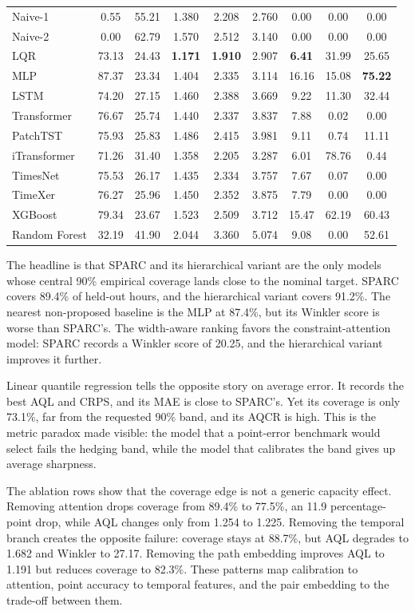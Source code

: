 \documentclass[twoside]{article}
\begin{document}
\begin{table}[t]
{\begin{tabular}{lcccccccc}
Naive-1 & 0.55 & 55.21 & 1.380 & 2.208 & 2.760 & 0.00 & 0.00 & 0.00 \\
Naive-2 & 0.00 & 62.79 & 1.570 & 2.512 & 3.140 & 0.00 & 0.00 & 0.00 \\
LQR & 73.13 & 24.43 & \textbf{1.171} & \textbf{1.910} & 2.907 & \textbf{6.41} & 31.99 & 25.65 \\
MLP & 87.37 & 23.34 & 1.404 & 2.335 & 3.114 & 16.16 & 15.08 & \textbf{75.22} \\
LSTM & 74.20 & 27.15 & 1.460 & 2.388 & 3.669 & 9.22 & 11.30 & 32.44 \\
Transformer & 76.67 & 25.74 & 1.440 & 2.337 & 3.837 & 7.88 & 0.02 & 0.00 \\
PatchTST & 75.93 & 25.83 & 1.486 & 2.415 & 3.981 & 9.11 & 0.74 & 11.11 \\
iTransformer & 71.26 & 31.40 & 1.358 & 2.205 & 3.287 & 6.01 & 78.76 & 0.44 \\
TimesNet & 75.53 & 26.17 & 1.435 & 2.334 & 3.757 & 7.67 & 0.07 & 0.00 \\
TimeXer & 76.27 & 25.96 & 1.450 & 2.352 & 3.875 & 7.79 & 0.00 & 0.00 \\
XGBoost & 79.34 & 23.67 & 1.523 & 2.509 & 3.712 & 15.47 & 62.19 & 60.43 \\
Random Forest & 32.19 & 41.90 & 2.044 & 3.360 & 5.074 & 9.08 & 0.00 & 52.61 \\
\bottomrule
\end{tabular}}
\end{table}

The headline is that SPARC and its hierarchical variant are the only models whose central 90\% empirical coverage lands close to the nominal target. SPARC covers 89.4\% of held-out hours, and the hierarchical variant covers 91.2\%. The nearest non-proposed baseline is the MLP at 87.4\%, but its Winkler score is worse than SPARC's. The width-aware ranking favors the constraint-attention model: SPARC records a Winkler score of 20.25, and the hierarchical variant improves it further.

Linear quantile regression tells the opposite story on average error. It records the best AQL and CRPS, and its MAE is close to SPARC's. Yet its coverage is only 73.1\%, far from the requested 90\% band, and its AQCR is high. This is the metric paradox made visible: the model that a point-error benchmark would select fails the hedging band, while the model that calibrates the band gives up average sharpness.

The ablation rows show that the coverage edge is not a generic capacity effect. Removing attention drops coverage from 89.4\% to 77.5\%, an 11.9 percentage-point drop, while AQL changes only from 1.254 to 1.225. Removing the temporal branch creates the opposite failure: coverage stays at 88.7\%, but AQL degrades to 1.682 and Winkler to 27.17. Removing the path embedding improves AQL to 1.191 but reduces coverage to 82.3\%. These patterns map calibration to attention, point accuracy to temporal features, and the pair embedding to the trade-off between them.
\end{document}
